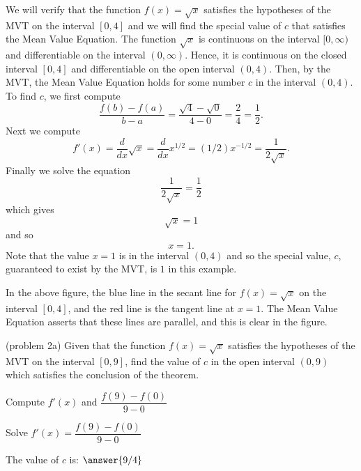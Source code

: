 \documentclass[handout]{ximera}
\begin{document}
\begin{example}[example 2]
We will verify that the function $f(x) = \sqrt x$ satisfies the hypotheses of the MVT
on the interval $[0,4]$ and we will find the special value of $c$ that satisfies the Mean Value Equation.
The function $\sqrt x$ is continuous on the interval $[0, \infty)$  and differentiable on the interval $(0, \infty)$. 
Hence, it is continuous on the closed interval $[0, 4]$ and differentiable on the open interval $(0, 4)$. 
Then, by the MVT,  the Mean Value Equation holds for some number 
$c$ in the interval $(0, 4)$. To find $c$, we first compute
\[\frac{f(b) - f(a)}{b-a} = \frac{\sqrt 4 - \sqrt 0}{4-0} = \frac{2}{4} = \frac{1}{2}.\]
Next we compute
\[f'(x) = \frac{d}{dx} \sqrt x = \frac{d}{dx} x^{1/2} = (1/2)x^{-1/2} = \frac{1}{2\sqrt x}.\]
Finally we solve the equation
\[\frac{1}{2\sqrt x} = \frac{1}{2}\]
which gives
\[\sqrt x = 1\]
and so 
\[ x=1.\]
Note that the value $x = 1$ is in the interval $(0,4)$ and so the special value, $c$, guaranteed to exist by the MVT,
is $1$ in this example.


\begin{image}
\end{image}

In the above figure, the blue line in the secant line for $f(x) = \sqrt x$ on the interval $[0, 4]$, 
and the red line is the tangent line at $x = 1$. The Mean Value Equation asserts that these lines are parallel, and this
is clear in the figure.
\end{example}

\begin{problem}(problem 2a)
  Given that the function $f(x) = \sqrt x$ satisfies the hypotheses of the MVT on the
	interval $[0,9]$, find the value of $c$ in the open interval $(0,9)$ which satisfies 
	the conclusion of the theorem.
	
    \begin{hint}
      Compute $f'(x)$ and $\dfrac{f(9) - f(0)}{9-0}$
    \end{hint}
		\begin{hint}
		  Solve $f'(x) = \dfrac{f(9) - f(0)}{9-0}$
		\end{hint}
		
		The value of $c$ is:
		 $\answer{9/4}$
\end{problem}
\end{document}

